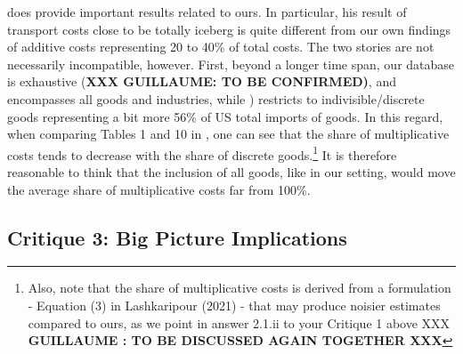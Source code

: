 \documentclass[a4paper,12pt]{article}
\begin{document}
\citet{Lashkaripour_JIE2020} does provide important results related to ours. In particular, his result of transport costs close to be totally iceberg is quite different from our own findings of additive costs representing 20 to 40\% of total costs. The two stories are not necessarily incompatible, however. First, beyond a longer time span, our database is exhaustive (\textbf{XXX GUILLAUME: TO BE CONFIRMED)}, and encompasses all goods and industries, while \citet{Lashkaripour_JIE2020}) restricts to indivisible/discrete goods representing a bit more 56\% of US total imports of goods. In this regard, when comparing Tables 1 and 10 in \citet{Lashkaripour_JIE2020}, one can see that the share of multiplicative costs tends to decrease with the share of discrete goods.\footnote{Also, note that the share of multiplicative costs is derived from a formulation - Equation (3) in Lashkaripour (2021) - that may produce noisier estimates compared to ours, as we point in answer 2.1.ii to your Critique 1 above XXX \textbf{GUILLAUME : TO BE DISCUSSED AGAIN TOGETHER XXX}} It is therefore reasonable to think that the inclusion of all goods, like in our setting, would move the average share of multiplicative costs far from 100\%.






\subsection{Critique 3: Big Picture Implications}
\end{document}
